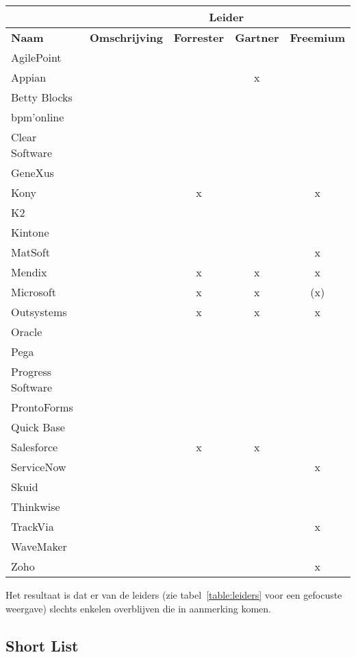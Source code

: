 \begin{longtable}{llccc}
    \textbf{} & \textbf{} & \multicolumn{2}{c}{\textbf{Leider}} & \multicolumn{1}{l}{\textbf{}} \\
    \endfirsthead
    \endhead
    \textbf{Naam} & \textbf{Omschrijving} & \multicolumn{1}{l}{\textbf{Forrester}} & \multicolumn{1}{l}{\textbf{Gartner}} & \multicolumn{1}{l}{\textbf{Freemium}} \\
    AgilePoint &  &  &  &  \\
    Appian &  &  & x &  \\
    Betty Blocks &  &  &  &  \\
    bpm'online &  &  &  &  \\
    Clear Software &  &  &  &  \\
    GeneXus &  &  &  &  \\
    Kony &  & x &  & x \\
    K2 &  &  &  &  \\
    Kintone &  &  &  &  \\
    MatSoft &  &  &  & x \\
    Mendix &  & x & x & x \\
    Microsoft &  & x & x & (x) \\
    Outsystems &  & x & x & x \\
    Oracle &  &  &  &  \\
    Pega &  &  &  &  \\
    Progress Software &  &  &  &  \\
    ProntoForms &  &  &  &  \\
    Quick Base &  &  &  &  \\
    Salesforce &  & x & x &  \\
    ServiceNow &  &  &  & x \\
    Skuid &  &  &  &  \\
    Thinkwise &  &  &  &  \\
    TrackVia &  &  &  & x \\
    WaveMaker &  &  &  &  \\
    Zoho &  &  &  & x
\end{longtable}

Het resultaat is dat er van de leiders (zie tabel~\ref{table:leiders} voor een gefocuste weergave) slechts enkelen overblijven die in aanmerking komen.

\subsection{Short List}

